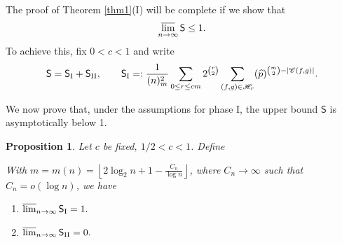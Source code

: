 \documentclass[reqno]{amsart}
\theoremstyle{theorem}
\newtheorem{proposition}[theorem]{Proposition}
\theoremstyle{definition}
\theoremstyle{remark}
\def\CC{\mathscr{C}}
\def\HH{\mathscr{H}}
\newcommand{\1}{{\text{\Large $\mathfrak 1$}}}	%
\renewcommand{\limsup}{\varlimsup}
\numberwithin{equation}{section}
\def\pmax{{\widehat p}}
\def\SSS{\mathsf S}
\def\SSSone{\mathsf S_{\text{\rm I}}}
\def\SSStwo{\mathsf S_{\text{\rm II}}}
\begin{document}
The proof of Theorem \ref{thm1}(I) will be complete
if we show that
\begin{equation}
\label{Sdone}
\limsup_{n \to \infty} \SSS \le 1.
\end{equation}
To achieve this, fix $0<c<1$ and write
\begin{equation}
\label{Ssplit}
\SSS = \SSSone + \SSStwo,
\qquad \SSSone =: \frac{1}{(n)_m^2} \sum_{0\le r \le cm}
2^{\binom{r}{2}} \sum_{(f,g) \in \HH_r} (\pmax)^{\binom{m}{2}-|\CC(f,g)|}.
\end{equation}

We now prove that, under the assumptions for phase I, 
the upper bound $\SSS$ is asymptotically below 1.

\begin{proposition}%
\label{S1part}
Let $c$ be fixed, $1/2<c<1$.
Define

With $m=m(n) = \left\lfloor 2 \log_2 n+1 - \frac{C_n}{\log n} \right\rfloor$, 
where $C_n \to \infty$ such that $C_n=o(\log n)$, we have
\begin{enumerate}[\rm (i)]
\item
$\limsup_{n \to \infty} \SSSone = 1.$
\item
$\limsup_{n \to \infty} \SSStwo = 0.$
\end{enumerate}
\end{proposition}
\end{document}
